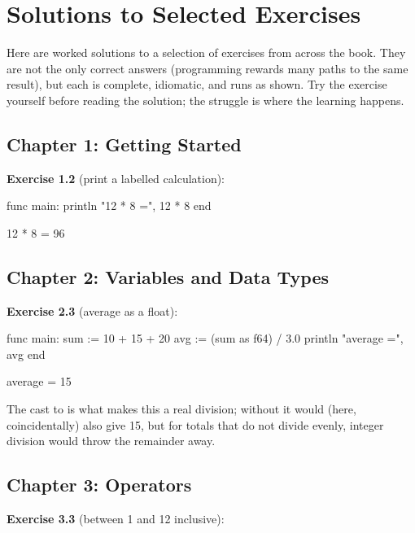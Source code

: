 \chapter{Solutions to Selected Exercises}%
\label{app:solutions}

Here are worked solutions to a selection of exercises from across the book. They
are not the only correct answers (programming rewards many paths to the same
result), but each is complete, idiomatic, and runs as shown. Try the exercise
yourself before reading the solution; the struggle is where the learning happens.

\section*{Chapter 1: Getting Started}

\textbf{Exercise 1.2} (print a labelled calculation):

\begin{salamen}
func main:
    println "12 * 8 =", 12 * 8
end
\end{salamen}

\begin{progout}
12 * 8 = 96
\end{progout}

\section*{Chapter 2: Variables and Data Types}

\textbf{Exercise 2.3} (average as a float):

\begin{salamen}
func main:
    sum := 10 + 15 + 20
    avg := (sum as f64) / 3.0
    println "average =", avg
end
\end{salamen}

\begin{progout}
average = 15
\end{progout}

The cast to  is what makes this a real division; without it
 would (here, coincidentally) also give 15, but for totals that do
not divide evenly, integer division would throw the remainder away.

\section*{Chapter 3: Operators}

\textbf{Exercise 3.3} (between 1 and 12 inclusive):

